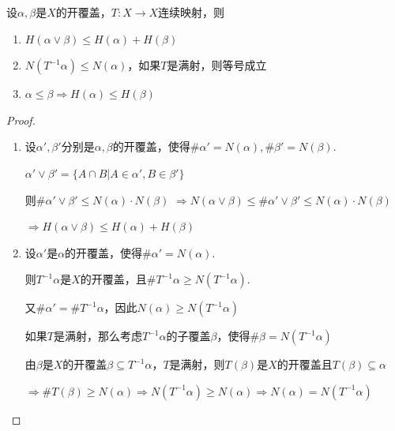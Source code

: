 \begin{lemma}{}
    设$\alpha,\beta$是$X$的开覆盖，$T:X\to X$连续映射，则
    \begin{enumerate}[(1)]
        \item $H(\alpha\vee \beta)\leq H(\alpha)+H(\beta)$
        \item $N(T^{-1}\alpha)\leq N(\alpha)$，如果$T$是满射，则等号成立
        \item $\alpha\leq \beta\Rightarrow H(\alpha)\leq H(\beta)$
    \end{enumerate}
\end{lemma}
\begin{proof}
    \begin{enumerate}[(1)]
        \item 设$\alpha',\beta'$分别是$\alpha,\beta$的开覆盖，使得$\#\alpha'=N(\alpha),\#\beta'=N(\beta)$.\par
        $\alpha'\vee\beta'=\{A\cap B|A\in\alpha',B\in\beta'\}$\par
        则$\#\alpha'\vee\beta'\leq N(\alpha)\cdot N(\beta)$
        $\Rightarrow N(\alpha\vee\beta)\leq\#\alpha'\vee\beta'\leq N(\alpha)\cdot N(\beta)$\par
        $\Rightarrow H(\alpha\vee\beta)\leq H(\alpha)+H(\beta)$
        \item 设$\alpha'$是$\alpha$的开覆盖，使得$\#\alpha'=N(\alpha)$.\par
        则$T^{-1}\alpha$是$X$的开覆盖，且$\# T^{-1}\alpha\geq N(T^{-1}\alpha)$.\par
        又$\#\alpha'=\# T^{-1}\alpha$，因此$N(\alpha)\geq N(T^{-1}\alpha)$\par
        如果$T$是满射，那么考虑$T^{-1}\alpha$的子覆盖$\beta$，使得$\#\beta=N(T^{-1}\alpha)$\par
        由$\beta$是$X$的开覆盖$\beta\subseteq T^{-1}\alpha$，$T$是满射，则$T(\beta)$是$X$的开覆盖且$T(\beta)\subseteq\alpha$\par
        $\Rightarrow \#T(\beta)\geq N(\alpha)\Rightarrow N(T^{-1}\alpha)\geq N(\alpha)\Rightarrow N(\alpha)=N(T^{-1}\alpha)$
    \end{enumerate}
\end{proof}

